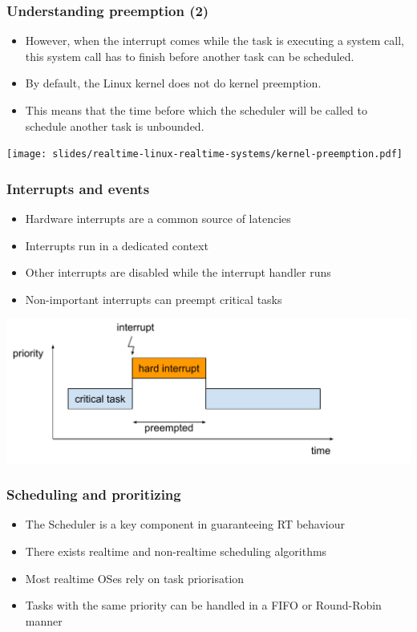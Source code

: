 \begin{frame}
  \frametitle{Understanding preemption (2)}
  \begin{itemize}
  \item However, when the interrupt comes while the task is executing
    a system call, this system call has to finish before another task
    can be scheduled.
  \item By default, the Linux kernel does not do kernel preemption.
  \item This means that the time before which the scheduler will be
    called to schedule another task is unbounded.
  \end{itemize}
  \begin{center}
    \texttt{[image: slides/realtime-linux-realtime-systems/kernel-preemption.pdf]}
  \end{center}
\end{frame}


\begin{frame}
  \frametitle{Interrupts and events}
	\begin{itemize}
		\item Hardware interrupts are a common source of latencies
		\item Interrupts run in a dedicated context
		\item Other interrupts are disabled while the interrupt handler runs
		\item Non-important interrupts can preempt critical tasks
	\end{itemize}
	\includegraphics[height=0.5\textheight]{slides/realtime-linux-realtime-systems/irq_preemption.pdf}
\end{frame}

\begin{frame}
  \frametitle{Scheduling and proritizing}
	\begin{itemize}
		\item The Scheduler is a key component in guaranteeing RT behaviour
		\item There exists realtime and non-realtime scheduling algorithms
		\item Most realtime OSes rely on task priorisation
		\item Tasks with the same priority can be handled in a FIFO or Round-Robin manner
	\end{itemize}
\end{frame}

